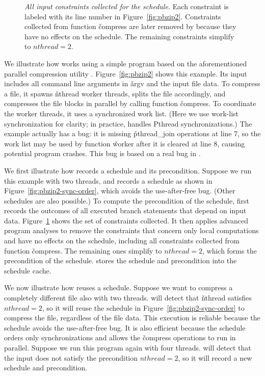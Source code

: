 \begin{figure}[t]
\centering
\begin{minipage}[c]{0.6\linewidth}
\tiny {}
\end{minipage}
\caption{{\it All input constraints collected for the schedule.}  Each
  constraint is labeled with its line number in
  Figure~\ref{fig:pbzip2}. Constraints collected from function
  \v{compress} are later removed by \tern because they have no effects on
  the schedule.  The remaining constraints simplify to
  $nthread=2$.} \label{fig:pbzip2-constraints}
\end{figure}

We illustrate how \tern works using a simple program based on the
aforementioned parallel compression utility \pbzip.
Figure~\ref{fig:pbzip2} shows this example. Its input includes all command
line arguments in \v{argv} and the input file data.
To compress a file, it spawns \v{nthread} worker threads,
splits the file accordingly, and compresses the file blocks in parallel by
calling function \v{compress}. To coordinate the worker threads, it uses a
synchronized work list. (Here we use work-list synchronization for
clarity; in practice, \tern handles Pthread synchronizations.) The example
actually has a bug: it is missing \v{pthread\_join} operations at line 7,
so the work list may be used by function \v{worker} after it is cleared at
line 8, causing potential program crashes. This bug is based on a real
bug in \pbzip.

We first illustrate how \tern records a schedule and its precondition.
Suppose we run this example with two threads, and \tern records a schedule
as shown in Figure~\ref{fig:pbzip2-sync-order}, which avoids the
use-after-free bug.  (Other schedules are also possible.)
To compute the precondition of the schedule, \tern first records the
outcomes of all executed branch statements that depend on input data.
Figure~\ref{fig:pbzip2-constraints} shows the set of constraints
collected.  It then applies advanced program analyses to remove the
constraints that concern only local computations and have no effects on
the schedule, including all constraints collected from function
\v{compress}.  The remaining ones simplify to $nthread=2$, which forms the
precondition of the schedule.  \tern stores the schedule and precondition
into the schedule cache.

We now illustrate how \tern reuses a schedule.  Suppose we want to
compress a completely different file also with two threads.  \tern will
detect that \v{nthread} satisfies $nthread=2$, so it will reuse the
schedule in Figure~\ref{fig:pbzip2-sync-order} to compress the file,
regardless of the file data.  This execution is reliable because the
schedule avoids the use-after-free bug.  It is also efficient because the
schedule orders only synchronizations and allows the \v{compress}
operations to run in parallel.  Suppose we run this program again with
four threads.  \tern will detect that the input does not satisfy the
precondition $nthread=2$, so it will record a new schedule and
precondition.

